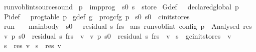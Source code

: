 \begin{isabelle}
\ run\isacharunderscore{}voblint\isacharunderscore{}source\isacharunderscore{}sound\isacharcolon{}\isanewline
\isaindent{\ \ }\ p\ \isacharcolon{}\isacharcolon{}\ imp\isacharunderscore{}prog\ \ s0\ s\ \isacharcolon{}\isacharcolon{}\ store\isanewline
\isaindent{\ \ }\ G\isacharunderscore{}def\isacharcolon{}\ \isachardoublequote{}{\isasymG}\ {\isasymequiv}\ declared\isacharunderscore{}global\ p\isachardoublequote{}\isanewline
\isaindent{\ \ \ \ \ \ }\ Pi\isacharunderscore{}def\isacharcolon{}\ \isachardoublequote{}{\isasymPi}\ {\isasymequiv}\ prog\isacharunderscore{}table\ p\isachardoublequote{}\isanewline
\isaindent{\ \ \ \ \ \ }\ g\isacharunderscore{}def\isacharcolon{}\ \isachardoublequote{}g\ {\isasymequiv}\ prog\isacharunderscore{}cfg\ p\isachardoublequote{}\isanewline
\isaindent{\ \ }\ s0\isacharcolon{}\ \isachardoublequote{}s0\ {\isasymin}\ cinit\isacharunderscore{}stores\ {\isasymG}\isachardoublequote{}\isanewline
\isaindent{\ \ \ \ \ \ }\ run\isacharcolon{}\ \isachardoublequote{}{\isasymG}\isacharcomma{}\ {\isasymPi}\ {\isasymturnstile}\ \isacharparenleft{}main\isacharunderscore{}body\ {\isasymPi}\isacharcomma{}\ s0\isacharcomma{}\ \isacharbrackleft{}\isacharbrackright{}\isacharparenright{}\ {\isasymrightarrow}\isactrlsup{\isacharasterisk{}}\ \isacharparenleft{}residual\isacharcomma{}\ s\isacharcomma{}\ frs\isacharparenright{}\isachardoublequote{}\isanewline
\isaindent{\ \ \ \ \ \ }\ ans\isacharcolon{}\ \isachardoublequote{}run\isacharunderscore{}voblint\ config\ p\ \isacharequal{}\ Analysed\ res\isachardoublequote{}\isanewline
\isaindent{\ \ }\ \isachardoublequote{}\isacharparenleft{}{\isasymexists}v\isachardot{}\ p\isacharcomma{}\ s0\ {\isasymturnstile}\ \isacharparenleft{}residual\isacharcomma{}\ s\isacharcomma{}\ frs\isacharparenright{}\ {\isasymrhd}\ v\isacharparenright{}\isanewline
\isaindent{\ \ \ \ \ \ \ }{\isasymand}\ \isacharparenleft{}{\isasymforall}v\isachardot{}\ p\isacharcomma{}\ s0\ {\isasymturnstile}\ \isacharparenleft{}residual\isacharcomma{}\ s\isacharcomma{}\ frs\isacharparenright{}\ {\isasymrhd}\ v\ {\isasymlongrightarrow}\isanewline
\isaindent{\ \ \ \ \ \ \ \ \ \ \ \ \ \ \ \ }s\ {\isasymin}\ {\isasymC}\isactrlbsub {\isasymG}\isacharcomma{}g\isacharcomma{}cinit\isacharunderscore{}stores\ {\isasymG}\isactrlesub{}\ v\isanewline
\isaindent{\ \ \ \ \ \ \ \ \ \ \ \ \ \ }{\isasymand}\ s\ {\isasymin}\ {\isasymR}\isactrlbsub res\isactrlesub{}\ v\isanewline
\isaindent{\ \ \ \ \ \ \ \ \ \ \ \ \ \ }{\isasymand}\ s\ {\isasymin}\ {\isasymV}\isactrlbsub res\isactrlesub{}\ v\isacharparenright{}\isachardoublequote{}
\end{isabelle}
